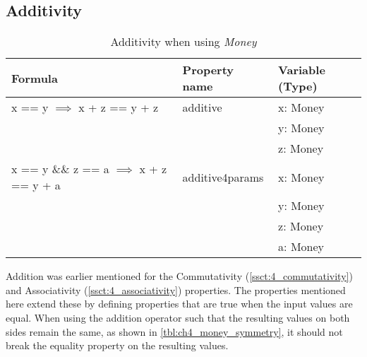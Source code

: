 \subsection*{Additivity}
\FloatBarrier
\begin{table}[!ht]
\centering
\begin{tabular}{lll}
\hline
                        \textbf{Formula}                             & \textbf{Property name} & \textbf{Variable (Type)} \\ \hline
\rowcolor[HTML]{EFEFEF} x == y $\implies$ x + z == y + z             & additive               & x: Money                 \\
\rowcolor[HTML]{EFEFEF}                                              &                        & y: Money                 \\
\rowcolor[HTML]{EFEFEF}                                              &                        & z: Money                 \\
                        x == y \&\& z == a $\implies$ x + z == y + a & additive4params        & x: Money                 \\
                                                                     &                        & y: Money                 \\
                                                                     &                        & z: Money                 \\
                                                                     &                        & a: Money                 \\ \hline
\end{tabular}
\caption{Additivity when using \textit{Money}}
\label{tbl:ch4_money_additivity}
\end{table}
\FloatBarrier
Addition was earlier mentioned for the Commutativity (\autoref{ssct:4_commutativity}) and Associativity (\autoref{ssct:4_associativity}) properties. The properties mentioned here extend these by defining properties that are true when the input values are equal. When using the addition operator such that the resulting values on both sides remain the same, as shown in \autoref{tbl:ch4_money_symmetry}, it should not break the equality property on the resulting values.

